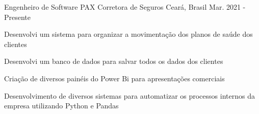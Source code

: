 \begin{cventries}
  \cventry
    {Engenheiro de Software} %
    {PAX Corretora de
    Seguros} %
    {Ceará, Brasil} %
    {Mar. 2021 - Presente} %
    {
      \begin{cvitems} %
        \item {Desenvolvi um sistema para organizar a movimentação dos planos de saúde dos clientes}
        \item {Desenvolvi um banco de dados
        para salvar todos os dados dos clientes}
        \item {Criação de diversos painéis do Power Bi para apresentações comerciais}
        \item {Desenvolvimento de diversos
        sistemas para automatizar os processos internos da empresa utilizando Python e Pandas}
      \end{cvitems}
    }

\end{cventries}
